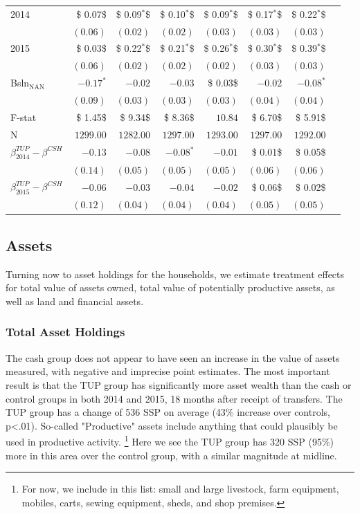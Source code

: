 \documentclass[12pt,article]{article}
\begin{document}
\begin{longtable}{lrrrrrrr}
2014 & \$ 0.07\$ & \$ 0.09$^{\textbf{*}}$\$ & \$ 0.10$^{\textbf{*}}$\$ & \$ 0.09$^{\textbf{*}}$\$ & \$ 0.17$^{\textbf{*}}$\$ & \$ 0.22$^{\textbf{*}}$\$\\
 & $( 0.06)$ & $( 0.02)$ & $( 0.02)$ & $( 0.03)$ & $( 0.03)$ & $( 0.03)$\\
2015 & \$ 0.03\$ & \$ 0.22$^{\textbf{*}}$\$ & \$ 0.21$^{\textbf{*}}$\$ & \$ 0.26$^{\textbf{*}}$\$ & \$ 0.30$^{\textbf{*}}$\$ & \$ 0.39$^{\textbf{*}}$\$\\
 & $( 0.06)$ & $( 0.02)$ & $( 0.02)$ & $( 0.02)$ & $( 0.03)$ & $( 0.03)$\\
Bsln$_{\text{NAN}}$ & $-0.17^{*}$ & $-0.02$ & $-0.03$ & \$ 0.03\$ & $-0.02$ & $-0.08^{*}$\\
 & $( 0.09)$ & $( 0.03)$ & $( 0.03)$ & $( 0.03)$ & $( 0.04)$ & $( 0.04)$\\
\hline
F-stat & \$ 1.45\$ & \$ 9.34\$ & \$ 8.36\$ & $10.84$ & \$ 6.70\$ & \$ 5.91\$\\
N & $1299.00$ & $1282.00$ & $1297.00$ & $1293.00$ & $1297.00$ & $1292.00$\\
\hline
$\beta^{TUP}_{2014}-\beta^{CSH}$ & $-0.13$ & $-0.08$ & $-0.08^{*}$ & $-0.01$ & \$ 0.01\$ & \$ 0.05\$\\
 & $( 0.14)$ & $( 0.05)$ & $( 0.05)$ & $( 0.05)$ & $( 0.06)$ & $( 0.06)$\\
$\beta^{TUP}_{2015}-\beta^{CSH}$ & $-0.06$ & $-0.03$ & $-0.04$ & $-0.02$ & \$ 0.06\$ & \$ 0.02\$\\
 & $( 0.12)$ & $( 0.04)$ & $( 0.04)$ & $( 0.04)$ & $( 0.05)$ & $( 0.05)$\\
\hline
\end{longtable}

\subsection{Assets}
\label{sec-3-5}

Turning now to asset holdings for the households, we estimate treatment effects for total value of assets owned, total
value of potentially productive assets, as well as land and financial assets. 

\subsubsection{Total Asset Holdings}
\label{sec-3-5-1}

The cash group does not appear to have seen an increase in the
value of assets measured, with negative and imprecise point estimates. The most
important result is that the TUP group has significantly more asset wealth than the
cash or control groups in both 2014 and 2015, 18 months after receipt of transfers.
The TUP group has a change of 536 SSP on average (43\% increase over controls, p<.01).
So-called "Productive" assets include anything that could plausibly be used in
productive activity. \footnote{For now, we include in this list: small and large
livestock, farm equipment, mobiles, carts, sewing equipment, sheds, and shop
premises.} Here we see the TUP group has 320 SSP (95\%) more in this area over the
control group, with a similar magnitude at midline.
\end{document}
